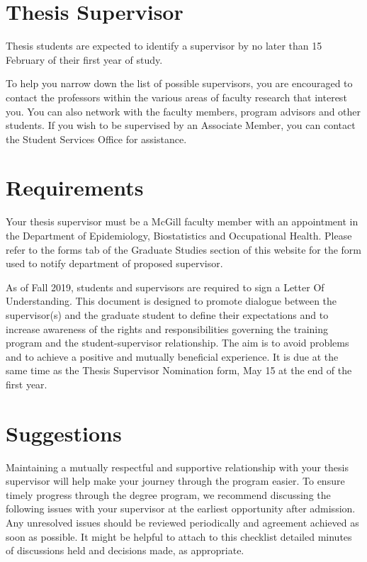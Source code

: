 \documentclass[
]{book}
\begin{document}
\hypertarget{thesis-supervisor}{%
\section{Thesis Supervisor}\label{thesis-supervisor}}

Thesis students are expected to identify a supervisor by no later than 15 February of their first year of study.

To help you narrow down the list of possible supervisors, you are encouraged to contact the professors within the various areas of faculty research that interest you. You can also network with the faculty members, program advisors and other students. If you wish to be supervised by an Associate Member, you can contact the Student Services Office for assistance.

\hypertarget{requirements}{%
\section{Requirements}\label{requirements}}

Your thesis supervisor must be a McGill faculty member with an appointment in the Department of Epidemiology, Biostatistics and Occupational Health. Please refer to the forms tab of the Graduate Studies section of this website for the form used to notify department of proposed supervisor.

As of Fall 2019, students and supervisors are required to sign a Letter Of Understanding. This document is designed to promote dialogue between the supervisor(s) and the graduate student to define their expectations and to increase awareness of the rights and responsibilities governing the training program and the student-supervisor relationship. The aim is to avoid problems and to achieve a positive and mutually beneficial experience. It is due at the same time as the Thesis Supervisor Nomination form, May 15 at the end of the first year.

\hypertarget{suggestions}{%
\section{Suggestions}\label{suggestions}}

Maintaining a mutually respectful and supportive relationship with your thesis supervisor will help make your journey through the program easier. To ensure timely progress through the degree program, we recommend discussing the following issues with your supervisor at the earliest opportunity after admission. Any unresolved issues should be reviewed periodically and agreement achieved as soon as possible. It might be helpful to attach to this checklist detailed minutes of discussions held and decisions made, as appropriate.
\end{document}
